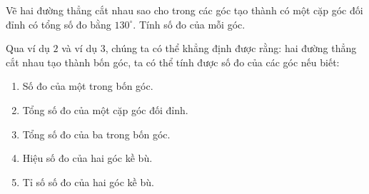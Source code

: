 \begin{vd}%
	Vẽ hai đường thẳng cắt nhau sao cho trong các góc tạo thành có một cặp góc đối đỉnh có tổng số đo bằng $130^{\circ}$. Tính số đo của mỗi góc.
\end{vd}
\begin{nx}
	Qua ví dụ $2$ và ví dụ $3$, chúng ta có thể khẳng định được rằng: hai đường thẳng cắt nhau tạo thành bốn góc, ta có thể tính được số đo của các góc nếu biết:
	\begin{enumerate}
		\item Số đo của một trong bốn góc.
		\item Tổng số đo của một cặp góc đối đỉnh.
		\item Tổng số đo của ba trong bốn góc.
		\item Hiệu số đo của hai góc kề bù.
		\item Tỉ số số đo của hai góc kề bù.
	\end{enumerate}
\end{nx}
